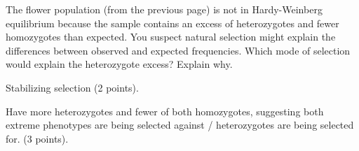 \question[5]
The flower population (from the previous page) is not in Hardy-Weinberg equilibrium because the sample contains an excess of heterozygotes and fewer homozygotes than expected.  You suspect natural selection might explain the differences between observed and expected frequencies.  Which mode of selection would explain the heterozygote excess?  Explain why. 

\begin{solution}
Stabilizing selection (2 points). 

Have more heterozygotes and fewer of both homozygotes, suggesting both extreme phenotypes are being selected against / heterozygotes are being selected for. (3 points).

\end{solution}
